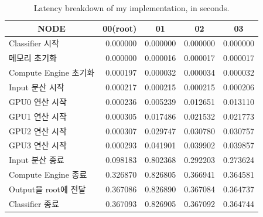 \begin{table}[]
    \centering
    \begin{tabular}{l|rrrr}
    \multicolumn{1}{c|}{NODE} & \multicolumn{1}{c}{00(root)} & \multicolumn{1}{c}{01} & \multicolumn{1}{c}{02} & \multicolumn{1}{c}{03} \\ \hline
    Classifier 시작           & 0.000000               & 0.000000               & 0.000000               & 0.000000               \\
    메모리 초기화              & 0.000000               & 0.000016               & 0.000017               & 0.000017               \\
    Compute Engine 초기화     & 0.000197               & 0.000032               & 0.000034               & 0.000032               \\
    Input 분산 시작            & 0.000217               & 0.000215               & 0.000215               & 0.000206               \\
    GPU0 연산 시작             & 0.000236               & 0.005239               & 0.012651               & 0.013110               \\
    GPU1 연산 시작             & 0.000305               & 0.017486               & 0.021532               & 0.021773               \\
    GPU2 연산 시작             & 0.000307               & 0.029747               & 0.030780               & 0.030757               \\
    GPU3 연산 시작             & 0.000293               & 0.041901               & 0.039902               & 0.039857               \\
    Input 분산 종료            & 0.098183               & 0.802368               & 0.292203               & 0.273624               \\
    Compute Engine 종료       & 0.326870               & 0.826805               & 0.366941               & 0.364581               \\
    Output을 root에 전달       & 0.367086               & 0.826890               & 0.367084               & 0.364737               \\
    Classifier 종료           & 0.367093               & 0.826905               & 0.367092               & 0.364744              
    \end{tabular}
    \caption{Latency breakdown of my implementation, in seconds.}
    \label{tab:latency_breakdown}
\end{table}

